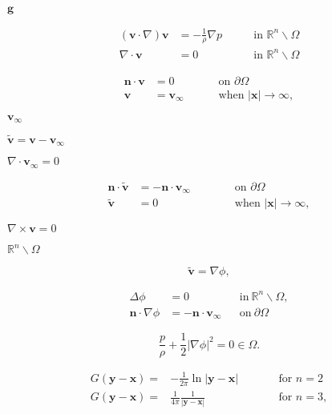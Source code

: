 \documentclass{article}
\begin{document}
$\mathbf{g}$
\pagebreak

\begin{align*} (\mathbf{v}\cdot\nabla)\mathbf{v} &= -\frac{1}{\rho}\nabla p \qquad &\text{in } \mathbb{R}^n \backslash \Omega \\ \nabla \cdot \mathbf{v}&=0 &\text{in } \mathbb{R}^n\backslash\Omega \end{align*}
\pagebreak

\[ \label{eq:boundary-conditions} \begin{aligned} \mathbf{n}\cdot\mathbf{v}& = 0 \qquad && \text{ on } \partial\Omega \\ \mathbf{v}& = \mathbf{v}_\infty && \text{ when } |\mathbf{x}| \to \infty, \end{aligned} \]
\pagebreak

$\mathbf{v}_\infty$
\pagebreak

$\mathbf{\tilde{v}}=\mathbf{v}-\mathbf{v}_\infty$
\pagebreak

$\nabla\cdot \mathbf{v}_\infty=0$
\pagebreak

\[ \label{eq:boundary-conditions-tilde} \begin{aligned} \mathbf{n}\cdot\mathbf{\tilde{v}}& = -\mathbf{n}\cdot\mathbf{v}_\infty \qquad && \text{ on } \partial\Omega \\ \mathbf{\tilde{v}}& = 0 && \text{ when } |\mathbf{x}| \to \infty, \end{aligned} \]
\pagebreak

$\nabla \times \mathbf{v}=0$
\pagebreak

$\mathbb{R}^n\backslash\Omega$
\pagebreak

\[ \mathbf{\tilde{v}}=\nabla\phi, \]
\pagebreak

\begin{align*} \label{laplace} \Delta\phi &= 0 \qquad &&\text{in}\ \mathbb{R}^n\backslash\Omega, \\ \mathbf{n}\cdot\nabla\phi &= -\mathbf{n}\cdot\mathbf{v}_\infty && \text{on}\ \partial\Omega \end{align*}
\pagebreak

\[ \frac{p}{\rho} +\frac{1}{2} | \nabla \phi |^2 = 0 \in \Omega. \]
\pagebreak

\[ \begin{aligned} \label{eq:3} G(\mathbf{y}-\mathbf{x}) = & -\frac{1}{2\pi}\ln|\mathbf{y}-\mathbf{x}| \qquad && \text{for } n=2 \\ G(\mathbf{y}-\mathbf{x}) = & \frac{1}{4\pi}\frac{1}{|\mathbf{y}-\mathbf{x}|}&& \text{for } n=3, \end{aligned} \]
\pagebreak
\end{document}

